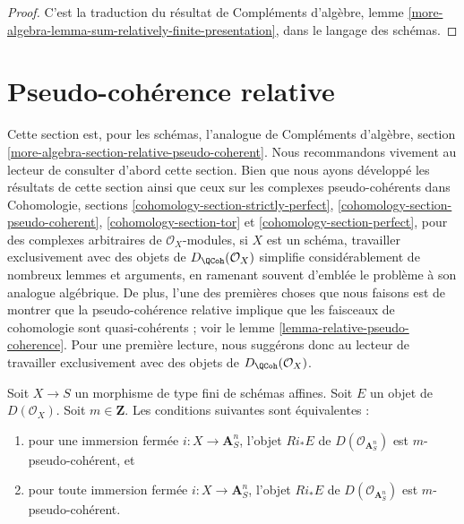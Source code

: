 \begin{proof}
C'est la traduction du résultat de
Compléments d'algèbre, lemme
\ref{more-algebra-lemma-sum-relatively-finite-presentation},
dans le langage des schémas.
\end{proof}










\section{Pseudo-cohérence relative}
\label{section-relative-pseudo-coherence}

\noindent
Cette section est, pour les schémas, l'analogue de
Compléments d'algèbre, section \ref{more-algebra-section-relative-pseudo-coherent}.
Nous recommandons vivement au lecteur de consulter d'abord cette
section. Bien que nous ayons développé les résultats de cette section
ainsi que ceux sur les complexes pseudo-cohérents dans
Cohomologie, sections \ref{cohomology-section-strictly-perfect},
\ref{cohomology-section-pseudo-coherent},
\ref{cohomology-section-tor} et
\ref{cohomology-section-perfect},
pour des complexes arbitraires de $\mathcal{O}_X$-modules, si
$X$ est un schéma, travailler exclusivement avec des objets de
$D_\QCoh(\mathcal{O}_X)$
simplifie considérablement de nombreux lemmes et arguments, en
ramenant souvent d'emblée le problème à son analogue algébrique.
De plus, l'une des premières choses que nous faisons est de montrer que
la pseudo-cohérence relative implique que les faisceaux de cohomologie
sont quasi-cohérents ; voir le lemme \ref{lemma-relative-pseudo-coherence}.
Pour une première lecture, nous suggérons donc au lecteur de travailler exclusivement
avec des objets de $D_\QCoh(\mathcal{O}_X)$.

\begin{lemma}
\label{lemma-relatively-pseudo-coherent}
Soit $X \to S$ un morphisme de type fini de schémas affines.
Soit $E$ un objet de $D(\mathcal{O}_X)$.
Soit $m \in \mathbf{Z}$.
Les conditions suivantes sont équivalentes :
\begin{enumerate}
\item pour une immersion fermée $i : X \to \mathbf{A}^n_S$,
l'objet $Ri_*E$ de $D(\mathcal{O}_{\mathbf{A}^n_S})$
est $m$-pseudo-cohérent, et
\item pour toute immersion fermée $i : X \to \mathbf{A}^n_S$,
l'objet $Ri_*E$ de $D(\mathcal{O}_{\mathbf{A}^n_S})$
est $m$-pseudo-cohérent.
\end{enumerate}
\end{lemma}

